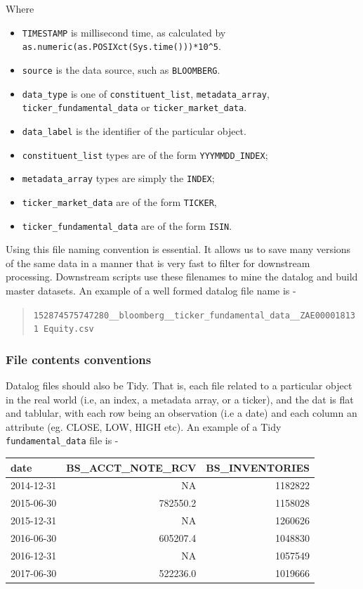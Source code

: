 \documentclass[11pt,preprint, authoryear]{elsarticle}
\numberwithin{equation}{section}
\numberwithin{figure}{section}
\numberwithin{table}{section}
\def\tightlist{} %
\begin{document}
Where

\begin{itemize}
\tightlist
\item
  \texttt{TIMESTAMP} is millisecond time, as calculated by
  \texttt{as.numeric(as.POSIXct(Sys.time()))*10\^{}5}.
\item
  \texttt{source} is the data source, such as \texttt{BLOOMBERG}.
\item
  \texttt{data\_type} is one of \texttt{constituent\_list},
  \texttt{metadata\_array}, \texttt{ticker\_fundamental\_data} or
  \texttt{ticker\_market\_data}.
\item
  \texttt{data\_label} is the identifier of the particular object.
\item
  \texttt{constituent\_list} types are of the form
  \texttt{YYYMMDD\_INDEX};
\item
  \texttt{metadata\_array} types are simply the \texttt{INDEX};
\item
  \texttt{ticker\_market\_data} are of the form \texttt{TICKER},
\item
  \texttt{ticker\_fundamental\_data} are of the form \texttt{ISIN}.
\end{itemize}

Using this file naming convention is essential. It allows us to save
many versions of the same data in a manner that is very fast to filter
for downstream processing. Downstream scripts use these filenames to
mine the datalog and build master datasets. An example of a well formed
datalog file name is -

\begin{quote}
\texttt{152874575747280\_\_bloomberg\_\_ticker\_fundamental\_data\_\_ZAE000018131\ Equity.csv}
\end{quote}

\subsubsection{File contents
conventions}\label{file-contents-conventions}

Datalog files should also be Tidy. That is, each file related to a
particular object in the real world (i.e, an index, a metadata array, or
a ticker), and the dat is flat and tablular, with each row being an
observation (i.e a date) and each column an attribute (eg. CLOSE, LOW,
HIGH etc). An example of a Tidy \texttt{fundamental\_data} file is -

\begin{longtable}[]{@{}lrr@{}}
\toprule
date & BS\_ACCT\_NOTE\_RCV & BS\_INVENTORIES\tabularnewline
\midrule
\endhead
2014-12-31 & NA & 1182822\tabularnewline
2015-06-30 & 782550.2 & 1158028\tabularnewline
2015-12-31 & NA & 1260626\tabularnewline
2016-06-30 & 605207.4 & 1048830\tabularnewline
2016-12-31 & NA & 1057549\tabularnewline
2017-06-30 & 522236.0 & 1019666\tabularnewline
\bottomrule
\end{longtable}
\end{document}
